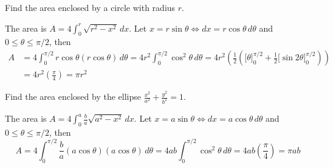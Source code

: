 \begin{problem}
    Find the area enclosed by a circle with radius \(r\).
\end{problem}
\begin{solution}
    The area is \(\displaystyle{A=4\int_0^r\sqrt{r^2-x^2}\,dx}\).
    Let \(x=r\sin\theta\iff dx=r\cos\theta\,d\theta\) and
    \(0\leq\theta\leq\pi/2\), then
    \begin{align*}
        A &= 4\int_0^{\pi/2}r\cos\theta(r\cos\theta)\,d\theta
        =4r^2\int_0^{\pi/2}\cos^2\theta\,d\theta
        =4r^2\left(\frac{1}{2}\left(\bigl[\theta\bigr]_0^{\pi/2}
        +\frac{1}{2}\bigl[\sin2\theta\bigr]_0^{\pi/2}\right)\right) \\
        &= 4r^2\left(\frac{\pi}{4}\right)=\pi r^2
    \end{align*}
\end{solution}
\begin{problem}
    Find the area enclosed by the ellipse
    \(\displaystyle{\frac{x^2}{a^2}+\frac{y^2}{b^2}}=1\).
\end{problem}
\begin{solution}
    The area is \(\displaystyle{A=4\int_0^a\frac{b}{a}\sqrt{a^2-x^2}\,dx}\).
    Let \(x=a\sin\theta\iff dx=a\cos\theta\,d\theta\) and
    \(0\leq\theta\leq\pi/2\), then
    \[A=4\int_0^{\pi/2}\frac{b}{a}(a\cos\theta)(a\cos\theta)\,d\theta
    =4ab\int_0^{\pi/2}\cos^2\theta\,d\theta
    =4ab\left(\frac{\pi}{4}\right)=\pi ab\]
\end{solution}